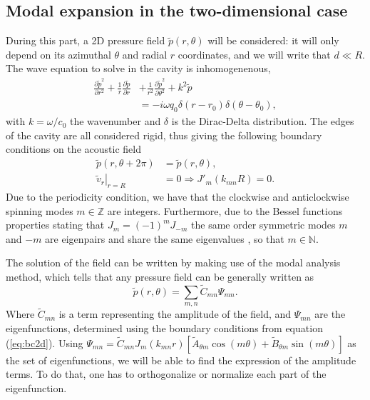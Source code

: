 \documentclass[%
 reprint,
 amsmath,amssymb,
 aps,
]{revtex4-2}
\begin{document}
\subsection{Modal expansion in the two-dimensional case}
During this part, a 2D pressure field $\tilde{p}(r, \theta)$ will be considered: it will only depend on its azimuthal $\theta$ and radial $r$ coordinates, and we will write that $d \ll R$. The wave equation to solve in the cavity is inhomogenenous,
\begin{equation}
    \begin{split}
        \frac{\partial \tilde{p}^2}{\partial r^2} + \frac{1}{r} \frac{\partial \tilde{p}}{\partial r} &+ \frac{1}{r^2} \frac{\partial \tilde{p}^2}{\partial \theta^2} + k^2 \tilde{p}\\ &= -i \omega q_0 \delta(r - r_0) \delta(\theta - \theta_0),
    \end{split} \label{eq:2dwaveq}
\end{equation}
with $k = \omega/c_0$ the wavenumber and $\delta$ is the Dirac-Delta distribution.
The edges of the cavity are all considered rigid, thus giving the following boundary conditions on the acoustic field
\begin{equation}
   \begin{split}
       \tilde{p}(r, \theta + 2 \pi) &= \tilde{p}(r, \theta),\\
               \left. \tilde{v}_r \right|_{r=R} & = 0 \Rightarrow J'_m (k_{mn}R) = 0.
   \end{split} \label{eq:bc2d}
\end{equation}
Due to the periodicity condition, we have that the clockwise and anticlockwise spinning modes $m \in \mathbb{Z}$ are integers. Furthermore, due to the Bessel functions properties stating that $J_m = (-1)^m J_{-m}$ the same order symmetric modes $m$ and $-m$ are eigenpairs and share the same eigenvalues \cite{rona2007}, so that $m \in \mathbb{N}$.

The solution of the field can be written by making use of the modal analysis method, which tells that any pressure field can be generally written as 
\begin{equation}
    \tilde{p}(r, \theta) = \sum_{m,n} \tilde{C}_{mn} \Psi_{mn}.
\end{equation}
Where $\tilde{C}_{mn}$ is a term representing the amplitude of the field, and $\Psi_{mn}$ are the eigenfunctions, determined using the boundary conditions from equation (\ref{eq:bc2d}). Using $\Psi_{mn} = \tilde{C}_{mn} J_m (k_{mn}r)\left[ \tilde{A}_{\theta m} \cos(m \theta) + \tilde{B}_{\theta m} \sin(m \theta) \right]$ as the set of eigenfunctions, we will be able to find the expression of the amplitude terms. To do that, one has to orthogonalize or normalize each part of the eigenfunction.
\end{document}
